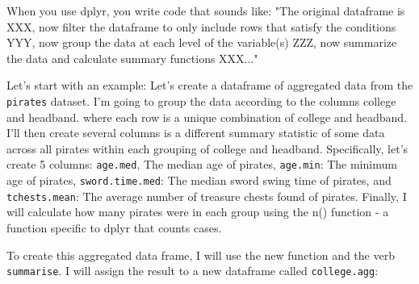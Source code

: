 \documentclass{tufte-book}\usepackage[]{graphicx}\usepackage[]{color}
\begin{document}
When you use dplyr, you write code that sounds like: "The original dataframe is XXX, now filter the dataframe to only include rows that satisfy the conditions YYY, now group the data at each level of the variable(s) ZZZ, now summarize the data and calculate summary functions XXX..."

Let's start with an example: Let's create a dataframe of aggregated data from the \texttt{pirates} dataset. I'm going to group the data according to the columns college and headband. where each row is a unique combination of college and headband. I'll then create several columns is a different summary statistic of some data across all pirates within each grouping of college and headband. Specifically, let's create 5 columns: \texttt{age.med}, The median age of pirates, \texttt{age.min}: The minimum age of pirates, \texttt{sword.time.med}: The median sword swing time of pirates, and \texttt{tchests.mean}: The average number of treasure chests found of pirates. Finally, I will calculate how many pirates were in each group using the n() function - a function specific to dplyr that counts cases.

To create this aggregated data frame, I will use the new function  and the verb \texttt{summarise}. I will assign the result to a new dataframe called \texttt{college.agg}:
\end{document}
